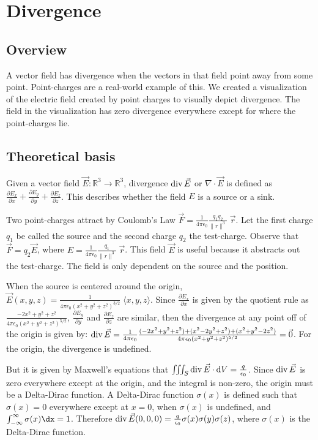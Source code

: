 \section{Divergence}

\subsection*{Overview}

A vector field has divergence when the vectors in that field point away from some point. Point-charges are a real-world example of this. We created a visualization of the electric field created by point charges to visually depict divergence. The field in the visualization has zero divergence everywhere except for where the point-charges lie.

\subsection*{Theoretical basis}

Given a vector field \(\vec E : \mathbb R^3 \to \mathbb R^3\), divergence \(\operatorname{div} \vec E\) or \(\nabla \cdot \vec E\) is defined as \(\frac{\partial E_x}{\partial x} + \frac{\partial E_y}{\partial y} + \frac{\partial E_z}{\partial z}\). This describes whether the field \(E\) is a source or a sink.

Two point-charges attract by Coulomb's Law \(\vec F = \frac{1}{4 \pi \epsilon_0} \frac{q_1 q_2}{\|r\|^3} \;\vec r\). Let the first charge \(q_1\) be called the source and the second charge \(q_2\) the test-charge. Observe that \(\vec F = q_2 \vec E\), where \(E = \frac{1}{4 \pi \epsilon_0} \frac{q_1}{\|r\|^3} \;\vec r\). This field \(\vec E\) is useful because it abstracts out the test-charge. The field is only dependent on the source and the position.

When the source is centered around the origin, \(\vec E(x, y, z) = \frac{1}{4 \pi \epsilon_0 (x^2+y^2+z^2)^{3/2}} \; \langle x, y, z \rangle\). Since \(\frac{\partial E_x}{\partial x}\) is given by the quotient rule as \(\frac{-2x^2+y^2+z^2}{4 \pi \epsilon_0 (x^2+y^2+z^2)^{5/2}}\), \(\frac{\partial E_y}{\partial y}\) and \(\frac{\partial E_z}{\partial z}\) are similar, then the divergence at any point off of the origin is given by: \(\operatorname{div} \vec E = \frac{1}{4 \pi \epsilon_0} \frac{(-2x^2 + y^2 + z^2) + (x^2 - 2y^2 + z^2) + (x^2 + y^2 - 2z^2)}{4 \pi \epsilon_0 (x^2 + y^2 + z^2)^{5/2}} = \vec 0\). For the origin, the divergence is undefined.

But it is given by Maxwell's equations that \(\iiint_S \divf \vec E \cdot \dif V = \frac{q}{\epsilon_0}\). Since \(\operatorname{div} \vec E\) is zero everywhere except at the origin, and the integral is non-zero, the origin must be a Delta-Dirac function. A Delta-Dirac function \(\sigma (x)\) is defined such that \(\sigma (x) = 0\) everywhere except at \(x = 0\), when \(\sigma(x)\) is undefined, and \(\int_{-\infty}^\infty \sigma(x) \dx = 1\).  Therefore \(\operatorname{div} \vec E (0, 0, 0) = \frac{q}{\epsilon_0} \sigma(x)\sigma(y)\sigma(z)\), where \(\sigma(x)\) is the Delta-Dirac function.

